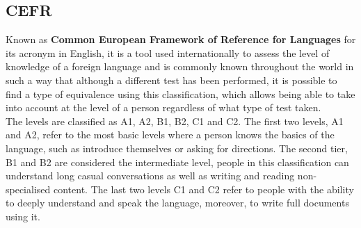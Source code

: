 
\subsection{CEFR}

Known as \textbf{Common European Framework of Reference for Languages} for its acronym in English, it is a tool used internationally to assess the level of knowledge of a foreign language and is commonly known throughout the world in such a way that although a different test has been performed, it is possible to find a type of equivalence using this classification, which allows being able to take into account at the level of a person regardless of what type of test taken.\\ 

The levels are classified as A1, A2, B1, B2, C1 and C2. The first two levels, A1 and A2, refer to the most basic levels where a person knows the basics of the language, such as introduce themselves or asking for directions. The second tier, B1 and B2 are considered the intermediate level, people in this classification can understand long casual conversations as well as writing and reading non-specialised content. The last two levels C1 and C2 refer to people with the ability to deeply understand and speak the language, moreover, to write full documents using it.
